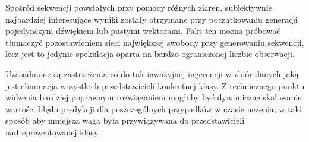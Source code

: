 {{        Spośród sekwencji powstałych przy pomocy różnych ziaren, subiektywnie najbardziej interesujące wyniki
        zostały otrzymane przy początkowaniu generacji pojedynczym dźwiękiem lub pustymi wektorami.
        Fakt ten można próbować tłumaczyć pozostawieniem sieci największej swobody przy generowaniu sekwencji, lecz
        jest to jedynie spekulacja oparta na bardzo ograniczonej liczbie obserwacji.

        \bigskip

        Uzasadnione są zastrzeżenia co do tak inwazyjnej ingerencji w zbiór danych jaką jest eliminacja 
        wszystkich przedstawicieli konkretnej klasy. Z technicznego punktu widzenia bardziej poprawnym 
        rozwiązaniem mogłoby być dynamiczne skalowanie wartości błędu predykcji dla poszczególnych przypadków w czasie uczenia, 
        w taki sposób aby mniejsza waga była przywiązywana do przedstawicieli nadreprezentowanej klasy.
    }
}